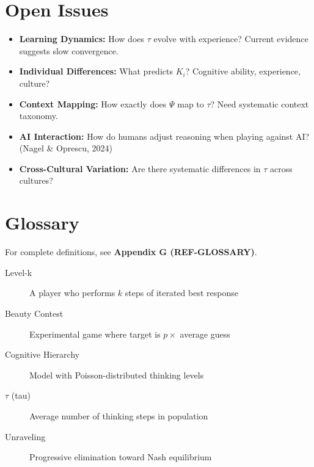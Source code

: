 \section{Open Issues}

\begin{itemize}
    \item \textbf{Learning Dynamics:} How does $\tau$ evolve with experience? Current evidence suggests slow convergence.

    \item \textbf{Individual Differences:} What predicts $K_i$? Cognitive ability, experience, culture?

    \item \textbf{Context Mapping:} How exactly does $\Psi$ map to $\tau$? Need systematic context taxonomy.

    \item \textbf{AI Interaction:} How do humans adjust reasoning when playing against AI? (Nagel \& Oprescu, 2024)

    \item \textbf{Cross-Cultural Variation:} Are there systematic differences in $\tau$ across cultures?
\end{itemize}

\section{Glossary}

For complete definitions, see \textbf{Appendix G (REF-GLOSSARY)}.

\begin{description}
    \item[Level-k] A player who performs $k$ steps of iterated best response
    \item[Beauty Contest] Experimental game where target is $p \times$ average guess
    \item[Cognitive Hierarchy] Model with Poisson-distributed thinking levels
    \item[$\tau$ (tau)] Average number of thinking steps in population
    \item[Unraveling] Progressive elimination toward Nash equilibrium
\end{description}

